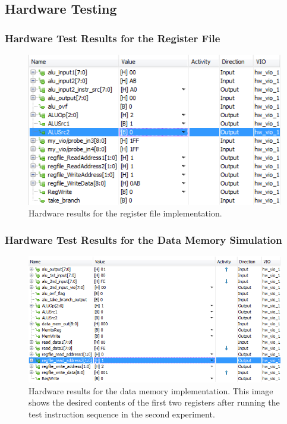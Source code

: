\documentclass[12pt, letterpaper]{article}
\begin{document}
\subsection{Hardware Testing}

\FloatBarrier
\subsubsection{Hardware Test Results for the Register File}
\begin{figure}[h]
\includegraphics[width=\linewidth]{images/lab4-results-2.png}
\caption{Hardware results for the register file implementation.}
\end{figure}

\FloatBarrier
\subsubsection{Hardware Test Results for the Data Memory Simulation}

\begin{figure}[h]
\includegraphics[width=\linewidth]{images/lab5-results-1.png}
\caption{Hardware results for the data memory implementation.  This image shows the desired contents of the first two registers after running the test instruction sequence in the second experiment.}
\end{figure}
\end{document}
